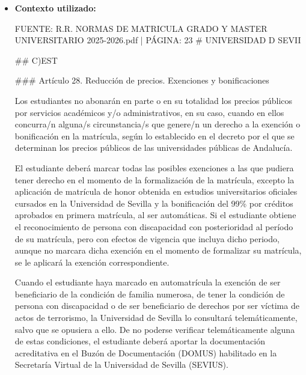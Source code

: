 \documentclass{article}
\begin{document}
\begin{itemize}
\begin{itemize}
                Recuerda que, si te opones a la consulta telemática, debes acreditar documentalmente tu condición de discapacidad y seguir el procedimiento establecido para ello. Puedes consultar más información en los enlaces proporcionados por la Universidad de Sevilla, como [https://osi.us.es](https://osi.us.es) y [https://osi.us.es/sites/osi/files/doc/c.i.gestionestudiantesoficialesModif1.12.5.20CT.pdf](https://osi.us.es/sites/osi/files/doc/c.i.gestionestudiantesoficialesModif1.12.5.20CT.pdf).
          \item \textbf{Contexto utilizado:}
                \begin{scriptsize}
                  FUENTE: R.R. NORMAS DE MATRICULA GRADO Y MASTER UNIVERSITARIO 2025-2026.pdf | PÁGINA: 23
                  \# UNIVERSIDAD D SEVII

                  \#\# C)EST

                  \#\#\# Artículo 28. Reducción de precios. Exenciones y bonificaciones

                  Los estudiantes no abonarán en parte o en su totalidad los precios públicos por servicios académicos y/o administrativos, en su caso, cuando en ellos concurra/n alguna/s circunstancia/s que genere/n un derecho a la exención o bonificación en la matrícula, según lo establecido en el decreto por el que se determinan los precios públicos de las universidades públicas de Andalucía.

                  El estudiante deberá marcar todas las posibles exenciones a las que pudiera tener derecho en el momento de la formalización de la matrícula, excepto la aplicación de matrícula de honor obtenida en estudios universitarios oficiales cursados en la Universidad de Sevilla y la bonificación del 99\% por créditos aprobados en primera matrícula, al ser automáticas. Si el estudiante obtiene el reconocimiento de persona con discapacidad con posterioridad al período de su matrícula, pero con efectos de vigencia que incluya dicho periodo, aunque no marcara dicha exención en el momento de formalizar su matrícula, se le aplicará la exención correspondiente.

                  Cuando el estudiante haya marcado en automatrícula la exención de ser beneficiario de la condición de familia numerosa, de tener la condición de persona con discapacidad o de ser beneficiario de derechos por ser víctima de actos de terrorismo, la Universidad de Sevilla lo consultará telemáticamente, salvo que se opusiera a ello. De no poderse verificar telemáticamente alguna de estas condiciones, el estudiante deberá aportar la documentación acreditativa en el Buzón de Documentación (DOMUS) habilitado en la Secretaría Virtual de la Universidad de Sevilla (SEVIUS).


\end{scriptsize}
\end{itemize}
\end{itemize}
\end{document}
